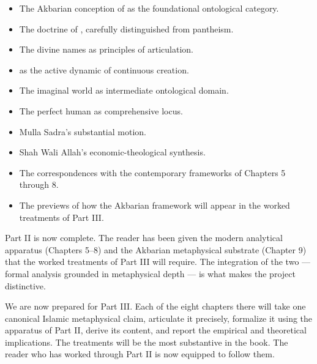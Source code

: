 \begin{itemize}[leftmargin=2em]
    \item The Akbarian conception of  as the foundational
    ontological category.
    \item The doctrine of , carefully
    distinguished from pantheism.
    \item The divine names as principles of articulation.
    \item {} as the active dynamic of continuous creation.
    \item The imaginal world as intermediate ontological domain.
    \item The perfect human as comprehensive locus.
    \item Mulla Sadra's substantial motion.
    \item Shah Wali Allah's economic-theological synthesis.
    \item The correspondences with the contemporary frameworks of
    Chapters 5 through 8.
    \item The previews of how the Akbarian framework will appear in
    the worked treatments of Part III.
\end{itemize}

Part II is now complete. The reader has been given the modern
analytical apparatus (Chapters 5--8) and the Akbarian metaphysical
substrate (Chapter 9) that the worked treatments of Part III will
require. The integration of the two --- formal analysis grounded in
metaphysical depth --- is what makes the project distinctive.

We are now prepared for Part III. Each of the eight chapters there
will take one canonical Islamic metaphysical claim, articulate it
precisely, formalize it using the apparatus of Part II, derive its
content, and report the empirical and theoretical implications. The
treatments will be the most substantive in the book. The reader who
has worked through Part II is now equipped to follow them.

